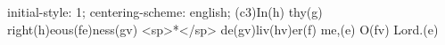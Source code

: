 initial-style: 1;
centering-scheme: english;
(c3)In(h) thy(g) right(h)eous(fe)ness(gv) <sp>*</sp> de(gv)liv(hv)er(f) me,(e) O(fv) Lord.(e)
